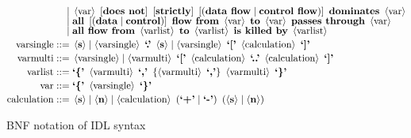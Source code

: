 \begin{minipage}{15cm}
\begin{align*}
         \mid {}&\left<\text{var}\right>\ \left[\text{\bf does not}\right]\ \left[\text{\bf strictly}\right]\ \left[\left(\text{\bf data flow} \mid \text{\bf control flow}\right)\right]\ \text{\bf dominates}\ \left<\text{var}\right>\\[-5pt]
         \mid {}&\text{\bf all}\ \left[\left(\text{\bf data} \mid \text{\bf control}\right)\right]\ \text{\bf flow from}\ \left<\text{var}\right>\ \text{\bf to}\ \left<\text{var}\right>\ \text{\bf passes through}\ \left<\text{var}\right>\\[-5pt]
         \mid {}&\text{\bf all flow from}\ \left<\text{varlist}\right>\ \text{\bf to}\ \left<\text{varlist}\right>\ \text{\bf is killed by}\ \left<\text{varlist}\right>\\[-1pt]
\text{varsingle}   ::= {}&\left<\text{\bf s}\right> \mid \left<\text{varsingle}\right>\ \text{\bf `.'}\ \left<\text{\bf s}\right> \mid \left<\text{varsingle}\right>\ \text{\bf `['}\ \left<\text{calculation}\right>\ \text{\bf `]'}\\[-1pt]
\text{varmulti}    ::= {}&\left<\text{varsingle}\right> \mid \left<\text{varmulti}\right>\ \text{\bf `['}\ \left<\text{calculation}\right>\ \text{\bf `..'}\ \left<\text{calculation}\right>\ \text{\bf `]'}\\[-1pt]
\text{varlist}     ::= {}&\text{\bf `\{'}\ \left<\text{varmulti}\right>\ \text{\bf `,'}\ \left\{ \left<\text{varmulti}\right>\ \text{\bf `,'} \right\}\ \left<\text{varmulti}\right>\ \text{\bf `\}'}\\[-1pt]
\text{var}         ::= {}&\text{\bf `\{'}\ \left<\text{varsingle}\right>\ \text{\bf `\}'}\\[-1pt]
\text{calculation} ::= {}&\left<\text{\bf s}\right> \mid \left<\text{\bf n}\right> \mid \left<\text{calculation}\right>\ \left( \text{\bf `+'} \mid \text{\bf `-'} \right)\ \left( \left<\text{\bf s}\right> \mid \left<\text{\bf n}\right> \right)
\end{align*}
\end{minipage}
\caption{BNF notation of IDL syntax}